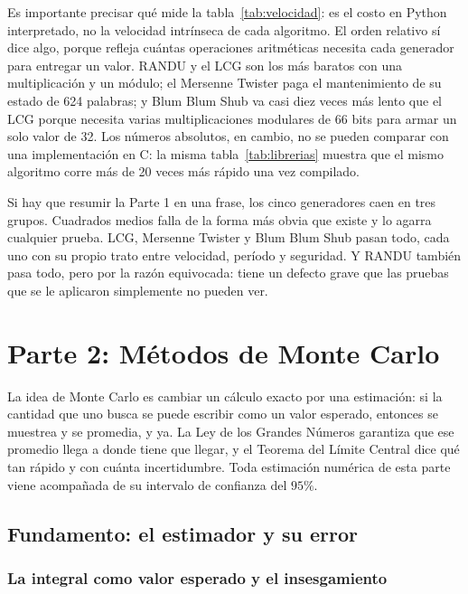 \documentclass[11pt,letterpaper]{article}
\begin{document}


Es importante precisar qué mide la tabla~\ref{tab:velocidad}: es el costo en Python
interpretado, no la velocidad intrínseca de cada algoritmo. El orden relativo
sí dice algo, porque refleja cuántas operaciones aritméticas necesita cada
generador para entregar un valor. RANDU y el LCG son los más baratos con una
multiplicación y un módulo; el Mersenne Twister paga el mantenimiento de su
estado de 624 palabras; y Blum Blum Shub va casi diez veces más lento que el
LCG porque necesita varias multiplicaciones modulares de 66 bits para armar
un solo valor de 32. Los números absolutos, en cambio, no se pueden comparar
con una implementación en C: la misma tabla~\ref{tab:librerias} muestra que
el mismo algoritmo corre más de 20 veces más rápido una vez compilado.

Si hay que resumir la Parte 1 en una frase, los cinco generadores caen en
tres grupos. Cuadrados medios falla de la forma más obvia que existe y lo
agarra cualquier prueba. LCG, Mersenne Twister y Blum Blum Shub pasan todo,
cada uno con su propio trato entre velocidad, período y seguridad. Y RANDU
también pasa todo, pero por la razón equivocada: tiene un defecto grave que
las pruebas que se le aplicaron simplemente no pueden ver.

\newpage
\section{Parte 2: Métodos de Monte Carlo}

La idea de Monte Carlo es cambiar un cálculo exacto por una estimación: si
la cantidad que uno busca se puede escribir como un valor esperado, entonces
se muestrea y se promedia, y ya. La Ley de los Grandes Números garantiza que
ese promedio llega a donde tiene que llegar, y el Teorema del Límite Central
dice qué tan rápido y con cuánta incertidumbre. Toda estimación numérica de
esta parte viene acompañada de su intervalo de confianza del $95\%$.

\subsection{Fundamento: el estimador y su error}

\subsubsection{La integral como valor esperado y el insesgamiento}
\end{document}
